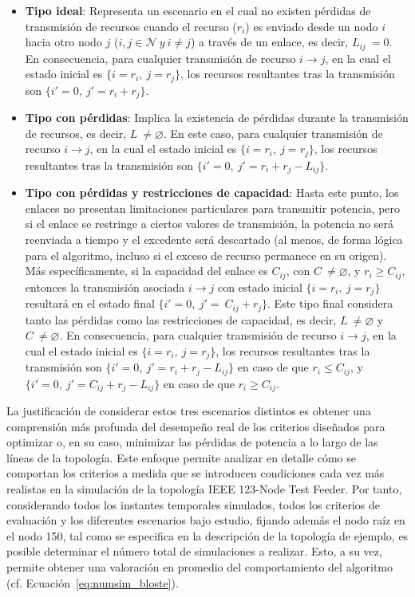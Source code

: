 \begin{itemize}
    \item \textbf{Tipo ideal}: Representa un escenario en el cual no existen pérdidas de transmisión de recursos cuando el recurso ($r_{i}$) es enviado desde un nodo $i$ hacia otro nodo $j$ ($i,j \in \mathcal{N} \: y \: i \neq j$) a través de un enlace, es decir, $L_{ij} \: = 0$. En consecuencia, para cualquier transmisión de recurso $i \rightarrow j$, en la cual el estado inicial es $\{i=r_{i},\: j=r_{j}\}$, los recursos resultantes tras la transmisión son $\{i' = 0,\: j' = r_{i}+r_{j}\}$.
    
    \item \textbf{Tipo con pérdidas}: Implica la existencia de pérdidas durante la transmisión de recursos, es decir, $L \: \neq \varnothing$. En este caso, para cualquier transmisión de recurso $i \rightarrow j$, en la cual el estado inicial es $\{i=r_{i},\: j=r_{j}\}$, los recursos resultantes tras la transmisión son $\{i' = 0,\: j' = r_{i}+r_{j}-L_{ij}\}$.
    
    \item \textbf{Tipo con pérdidas y restricciones de capacidad}: Hasta este punto, los enlaces no presentan limitaciones particulares para transmitir potencia, pero si el enlace se restringe a ciertos valores de transmisión, la potencia no será reenviada a tiempo y el excedente será descartado (al menos, de forma lógica para el algoritmo, incluso si el exceso de recurso permanece en su origen). Más específicamente, si la capacidad del enlace es $C_{ij}$, con $C \: \neq \varnothing$, y $r_{i} \geq C_{ij}$, entonces la transmisión asociada $i \rightarrow j$ con estado inicial $\{i=r_{i},\: j=r_{j}\}$ resultará en el estado final $\{i' = 0,\: j' = \: C_{ij}+r_{j}\}$. Este tipo final considera tanto las pérdidas como las restricciones de capacidad, es decir, $L \: \neq \varnothing$ y $C \: \neq \varnothing$. En consecuencia, para cualquier transmisión de recurso $i \rightarrow j$, en la cual el estado inicial es $\{i=r_{i},\: j=r_{j}\}$, los recursos resultantes tras la transmisión son $\{i' = 0,\: j' = r_{i}+r_{j}-L_{ij}\}$ en caso de que $r_{i} \leq C_{ij}$, y $\{i' = 0,\: j' = C_{ij}+r_{j}-L_{ij}\}$ en caso de que $r_{i} \geq C_{ij}$.
\end{itemize}

La justificación de considerar estos tres escenarios distintos es obtener una comprensión más profunda del desempeño real de los criterios diseñados para optimizar o, en su caso, minimizar las pérdidas de potencia a lo largo de las líneas de la topología. Este enfoque permite analizar en detalle cómo se comportan los criterios a medida que se introducen condiciones cada vez más realistas en la simulación de la topología IEEE 123-Node Test Feeder. Por tanto, considerando todos los instantes temporales simulados, todos los criterios de evaluación y los diferentes escenarios bajo estudio, fijando además el nodo raíz en el nodo 150, tal como se especifica en la descripción de la topología de ejemplo, es posible determinar el número total de simulaciones a realizar. Esto, a su vez, permite obtener una valoración en promedio del comportamiento del algoritmo (cf. Ecuación~\ref{eq:numsim_bloste}).\\

